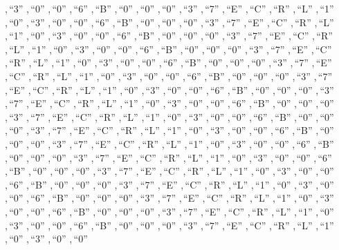 \documentclass{article}
\makeatletter
\renewcommand{\_}{\rule{.4em}{.06em}\hspace{.05em}}
\renewcommand{\.}[1]{\ensuremath{\mbox{}#1\mbox{}}}
\newcommand{\@w}[1]{\textsf{``{#1}''}}
\makeatother
\begin{document}
{ ,\,\@w{3} ,\,\@w{0} ,\,\@w{0} ,\,\@w{6} ,\,\@w{B} ,\,\@w{0} ,\,\@w{0}
 ,\,\@w{0} ,\,\@w{3} ,\,\@w{7} ,\,\@w{E} ,\,\@w{C} ,\,\@w{R} ,\,\@w{L}
 ,\,\@w{1} ,\,\@w{0} ,\,\@w{3} ,\,\@w{0} ,\,\@w{0} ,\,\@w{6} ,\,\@w{B}
 ,\,\@w{0} ,\,\@w{0} ,\,\@w{0} ,\,\@w{3} ,\,\@w{7} ,\,\@w{E} ,\,\@w{C}
 ,\,\@w{R} ,\,\@w{L} ,\,\@w{1} ,\,\@w{0} ,\,\@w{3} ,\,\@w{0} ,\,\@w{0}
 ,\,\@w{6} ,\,\@w{B} ,\,\@w{0} ,\,\@w{0} ,\,\@w{0} ,\,\@w{3} ,\,\@w{7}
 ,\,\@w{E} ,\,\@w{C} ,\,\@w{R} ,\,\@w{L} ,\,\@w{1} ,\,\@w{0} ,\,\@w{3}
 ,\,\@w{0} ,\,\@w{0} ,\,\@w{6} ,\,\@w{B} ,\,\@w{0} ,\,\@w{0} ,\,\@w{0}
 ,\,\@w{3} ,\,\@w{7} ,\,\@w{E} ,\,\@w{C} ,\,\@w{R} ,\,\@w{L} ,\,\@w{1}
 ,\,\@w{0} ,\,\@w{3} ,\,\@w{0} ,\,\@w{0} ,\,\@w{6} ,\,\@w{B} ,\,\@w{0}
 ,\,\@w{0} ,\,\@w{0} ,\,\@w{3} ,\,\@w{7} ,\,\@w{E} ,\,\@w{C} ,\,\@w{R}
 ,\,\@w{L} ,\,\@w{1} ,\,\@w{0} ,\,\@w{3} ,\,\@w{0} ,\,\@w{0} ,\,\@w{6}
 ,\,\@w{B} ,\,\@w{0} ,\,\@w{0} ,\,\@w{0} ,\,\@w{3} ,\,\@w{7} ,\,\@w{E}
 ,\,\@w{C} ,\,\@w{R} ,\,\@w{L} ,\,\@w{1} ,\,\@w{0} ,\,\@w{3} ,\,\@w{0}
 ,\,\@w{0} ,\,\@w{6} ,\,\@w{B} ,\,\@w{0} ,\,\@w{0} ,\,\@w{0} ,\,\@w{3}
 ,\,\@w{7} ,\,\@w{E} ,\,\@w{C} ,\,\@w{R} ,\,\@w{L} ,\,\@w{1} ,\,\@w{0}
 ,\,\@w{3} ,\,\@w{0} ,\,\@w{0} ,\,\@w{6} ,\,\@w{B} ,\,\@w{0} ,\,\@w{0}
 ,\,\@w{0} ,\,\@w{3} ,\,\@w{7} ,\,\@w{E} ,\,\@w{C} ,\,\@w{R} ,\,\@w{L}
 ,\,\@w{1} ,\,\@w{0} ,\,\@w{3} ,\,\@w{0} ,\,\@w{0} ,\,\@w{6} ,\,\@w{B}
 ,\,\@w{0} ,\,\@w{0} ,\,\@w{0} ,\,\@w{3} ,\,\@w{7} ,\,\@w{E} ,\,\@w{C}
 ,\,\@w{R} ,\,\@w{L} ,\,\@w{1} ,\,\@w{0} ,\,\@w{3} ,\,\@w{0} ,\,\@w{0}
 ,\,\@w{6} ,\,\@w{B} ,\,\@w{0} ,\,\@w{0} ,\,\@w{0} ,\,\@w{3} ,\,\@w{7}
 ,\,\@w{E} ,\,\@w{C} ,\,\@w{R} ,\,\@w{L} ,\,\@w{1} ,\,\@w{0} ,\,\@w{3}
 ,\,\@w{0} ,\,\@w{0} ,\,\@w{6} ,\,\@w{B} ,\,\@w{0} ,\,\@w{0} ,\,\@w{0}
 ,\,\@w{3} ,\,\@w{7} ,\,\@w{E} ,\,\@w{C} ,\,\@w{R} ,\,\@w{L} ,\,\@w{1}
 ,\,\@w{0} ,\,\@w{3} ,\,\@w{0} ,\,\@w{0} ,\,\@w{6} ,\,\@w{B} ,\,\@w{0}
 ,\,\@w{0} ,\,\@w{0} ,\,\@w{3} ,\,\@w{7} ,\,\@w{E} ,\,\@w{C} ,\,\@w{R}
 ,\,\@w{L} ,\,\@w{1} ,\,\@w{0} ,\,\@w{3} ,\,\@w{0} ,\,\@w{0} ,\,\@w{6}
 ,\,\@w{B} ,\,\@w{0} ,\,\@w{0} ,\,\@w{0} ,\,\@w{3} ,\,\@w{7} ,\,\@w{E}
 ,\,\@w{C} ,\,\@w{R} ,\,\@w{L} ,\,\@w{1} ,\,\@w{0} ,\,\@w{3} ,\,\@w{0}
 ,\,\@w{0} ,\,\@w{6} ,\,\@w{B} ,\,\@w{0} ,\,\@w{0} ,\,\@w{0} ,\,\@w{3}
 ,\,\@w{7} ,\,\@w{E} ,\,\@w{C} ,\,\@w{R} ,\,\@w{L} ,\,\@w{1} ,\,\@w{0}
 ,\,\@w{3} ,\,\@w{0} ,\,\@w{0} ,\,\@w{6} ,\,\@w{B} ,\,\@w{0} ,\,\@w{0}
 ,\,\@w{0} ,\,\@w{3} ,\,\@w{7} ,\,\@w{E} ,\,\@w{C} ,\,\@w{R} ,\,\@w{L}
 ,\,\@w{1} ,\,\@w{0} ,\,\@w{3} ,\,\@w{0} ,\,\@w{0} ,\,\@w{6} ,\,\@w{B}
 ,\,\@w{0} ,\,\@w{0} ,\,\@w{0} ,\,\@w{3} ,\,\@w{7} ,\,\@w{E} ,\,\@w{C}
 ,\,\@w{R} ,\,\@w{L} ,\,\@w{1} ,\,\@w{0} ,\,\@w{3} ,\,\@w{0} ,\,\@w{0}
}
\end{document}
